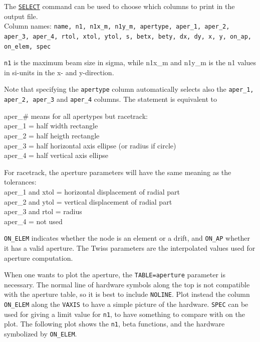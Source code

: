 The \hyperref[sec:select]{\texttt{SELECT}} command can be  used to
choose which columns to print in the output file.   
\\ Column names: \texttt{name, n1, n1x\_m, n1y\_m, apertype, aper\_1, aper\_2,
aper\_3, aper\_4, rtol, xtol, ytol, s, betx, bety, dx, dy, x, y, on\_ap,
on\_elem, spec}  

\texttt{n1} is the maximum beam size in sigma, while n1x\_m and n1y\_m is the n1
values in si-units in the x- and y-direction.  

Note that specifying the \texttt{apertype} column automatically selects also the
\texttt{aper\_1, aper\_2, aper\_3} and \texttt{aper\_4} columns. The statement
is equivalent to

aper\_\# means for all apertypes but racetrack:
\\ aper\_1 = half width rectangle
\\ aper\_2 = half heigth rectangle
\\ aper\_3 = half horizontal axis ellipse (or radius if circle)
\\ aper\_4 = half vertical axis ellipse

For racetrack, the aperture parameters will have the same meaning as the
tolerances: 
\\ aper\_1 and xtol = horizontal displacement of radial part 
\\ aper\_2 and ytol = vertical displacement of radial part 
\\ aper\_3 and rtol = radius 
\\ aper\_4 = not used 

\texttt{ON\_ELEM} indicates whether the node is an element or a drift, and
\texttt{ON\_AP} whether it has a valid aperture. The Twiss parameters are the
interpolated values used for aperture computation.  

When one wants to plot the aperture, the \texttt{TABLE=aperture} parameter
is necessary. The normal line of hardware symbols along the top is not
compatible with the aperture table, so it is best to include
\texttt{NOLINE}. Plot instead the column \texttt{ON\_ELEM} along the
\texttt{VAXIS} to have a simple picture of the hardware. \texttt{SPEC}
can be used for giving a limit value for \texttt{n1}, to have something
to compare with on the plot. The following plot shows the \texttt{n1},
beta functions, and the hardware symbolized by \texttt{ON\_ELEM}.     

